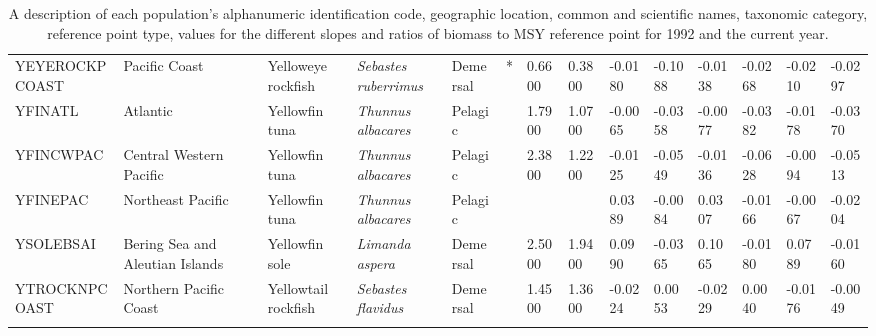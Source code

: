 \begin{longtable}{p{2.6cm}p{1.9cm}p{1.7cm}p{1.6cm}p{1cm}p{0.3cm}p{1cm}p{1cm}p{1cm}p{1.1cm}p{1cm}p{1.1cm}p{1cm}p{1.1cm}}
  YEYEROCKPCOAST & Pacific Coast & Yelloweye rockfish & \textit{Sebastes ruberrimus} & Demersal & * & 0.6600 & 0.3800 & -0.0180 & -0.1088 & -0.0138 & -0.0268 & -0.0210 & -0.0297 \\ 
  YFINATL & Atlantic & Yellowfin tuna & \textit{Thunnus albacares} & Pelagic &   & 1.7900 & 1.0700 & -0.0065 & -0.0358 & -0.0077 & -0.0382 & -0.0178 & -0.0370 \\ 
  YFINCWPAC & Central Western Pacific & Yellowfin tuna & \textit{Thunnus albacares} & Pelagic &   & 2.3800 & 1.2200 & -0.0125 & -0.0549 & -0.0136 & -0.0628 & -0.0094 & -0.0513 \\ 
  YFINEPAC & Northeast Pacific & Yellowfin tuna & \textit{Thunnus albacares} & Pelagic &  &  &  & 0.0389 & -0.0084 & 0.0307 & -0.0166 & -0.0067 & -0.0204 \\ 
  YSOLEBSAI & Bering Sea and Aleutian Islands & Yellowfin sole & \textit{Limanda aspera} & Demersal &   & 2.5000 & 1.9400 & 0.0990 & -0.0365 & 0.1065 & -0.0180 & 0.0789 & -0.0160 \\ 
  YTROCKNPCOAST & Northern Pacific Coast & Yellowtail rockfish & \textit{Sebastes flavidus} & Demersal &   & 1.4500 & 1.3600 & -0.0224 & 0.0053 & -0.0229 & 0.0040 & -0.0176 & -0.0049 \\ 
   \hline
\hline
\caption{A description of each population's alphanumeric identification code, geographic location, common and scientific names, taxonomic category, reference point type, values for the different slopes and ratios of biomass to MSY reference point for 1992 and the current year.}
\label{tab:S1}
\end{longtable}

